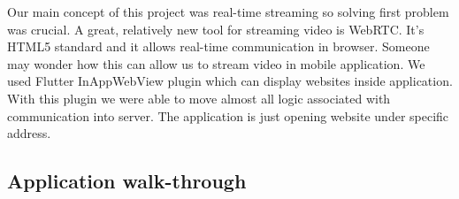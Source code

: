 \documentclass[../Main.tex]{subfiles}
\begin{document}
Our main concept of this project was real-time streaming so solving first problem was crucial.
A great, relatively new tool for streaming video is WebRTC.
It's HTML5 standard and it allows real-time communication in browser. 
Someone may wonder how this can allow us to stream video in mobile application.
We used Flutter InAppWebView plugin which can display websites inside application.
With this plugin we were able to move almost all logic associated with communication into server.
The application is just opening website under specific address.




\subsection{Application walk-through}
\end{document}
